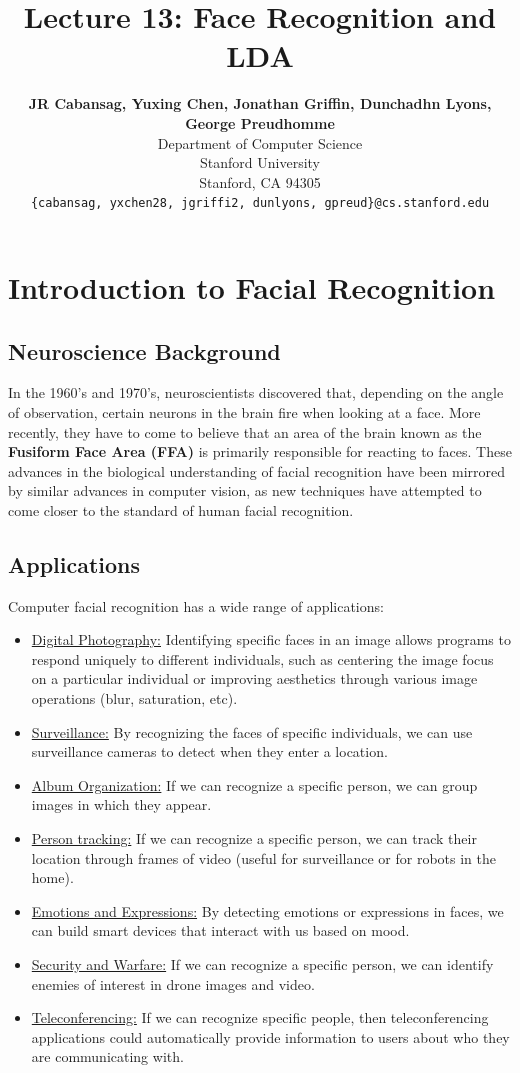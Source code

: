 \documentclass{article}
\title{Lecture 13: Face Recognition and LDA}
\author{
  \textbf{JR Cabansag, Yuxing Chen, Jonathan Griffin, Dunchadhn Lyons, George Preudhomme} \\
  Department of Computer Science\\
  Stanford University\\
  Stanford, CA 94305 \\
  \texttt{\{cabansag, yxchen28, jgriffi2, dunlyons, gpreud\}@cs.stanford.edu} \\
}
\begin{document}
\maketitle

\section{Introduction to Facial Recognition}
\subsection{Neuroscience Background}
In the 1960's and 1970's, neuroscientists discovered that, depending on the angle of observation, certain neurons in the brain fire when looking at a face. More recently, they have to come to believe that an area of the brain known as the \textbf{Fusiform Face Area (FFA)} is primarily responsible for reacting to faces. These advances in the biological understanding of facial recognition have been mirrored by similar advances in computer vision, as new techniques have attempted to come closer to the standard of human facial recognition. 

\subsection{Applications}
Computer facial recognition has a wide range of applications:
\begin{itemize}
  \item \underline{Digital Photography:} Identifying specific faces in an image allows programs to respond uniquely to different individuals, such as centering the image focus on a particular individual or improving aesthetics through various image operations (blur, saturation, etc).
  \item \underline{Surveillance:} By recognizing the faces of specific individuals, we can use surveillance cameras to detect when they enter a location.
  \item \underline{Album Organization:} If we can recognize a specific person, we can group images in which they appear.
  \item \underline{Person tracking:} If we can recognize a specific person, we can track their location through frames of video (useful for surveillance or for robots in the home).
  \item \underline{Emotions and Expressions:} By detecting emotions or expressions in faces, we can build smart devices that interact with us based on mood.
  \item \underline{Security and Warfare:} If we can recognize a specific person, we can identify enemies of interest in drone images and video.
  \item \underline{Teleconferencing:} If we can recognize specific people, then teleconferencing applications could automatically provide information to users about who they are communicating with.
\end{itemize}
\end{document}
